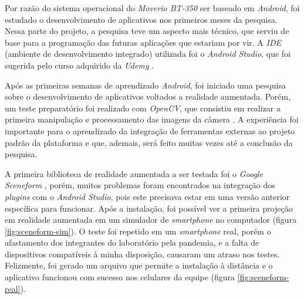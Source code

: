 Por razão do sistema operacional do \textit{Moverio BT-350} ser baseado em \textit{Android}, foi estudado o desenvolvimento de aplicativos nos primeiros meses da pesquisa. Nessa parte do projeto, a pesquisa teve um aspecto mais técnico, que serviu de base para a programação das futuras aplicações que estariam por vir. A \textit{IDE} (ambiente de desenvolvimento integrado) utilizada foi o \textit{Android Studio}, que foi sugerida pelo curso adquirido da \textit{Udemy} \cite{udemy}.

Após as primeiras semanas de aprendizado \textit{Android}, foi iniciado uma pesquisa sobre o desenvolvimento de aplicativos voltados a realidade aumentada. Porém, um teste preparatório foi realizado com \textit{OpenCV},  que consistiu em realizar a primeira manipulação e processamento das imagens da câmera \cite{opencv}. A experiência foi importante para o aprendizado da integração de ferramentas externas ao projeto padrão da plataforma e que, ademais, será feito muitas vezes até a conclusão da pesquisa.

A primeira biblioteca de realidade aumentada a ser testada foi o \textit{Google Sceneform} \cite{Sceneform}, porém, muitos problemas foram encontrados na integração dos \textit{plugins} com o \textit{Android Studio}, pois este precisava estar em uma versão anterior específica para funcionar. Após a instalação, foi possível ver a primeira projeção em realidade aumentada em um simulador de \textit{smartphone} no computador (figura \ref{fig:sceneform-sim}). O teste foi repetido em um \textit{smartphone} real, porém o afastamento dos integrantes do laboratório pela pandemia, e a falta de dispositivos compatíveis à minha disposição, causaram um atraso nos testes. Felizmente, foi gerado um arquivo que permite a instalação à distância e o aplicativo funcionou com sucesso nos celulares da equipe (figura \ref{fig:sceneform-real}).

